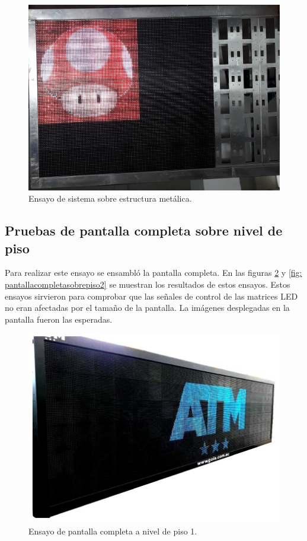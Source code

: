 \begin{figure}[htpb]
	\centering
	\includegraphics[scale=0.1]{Figures/matrizsobreestructura.jpg} 
	\caption{Ensayo de sistema sobre estructura metálica.}
	\label{fig: matrizestructuraparcial}
\end{figure}

\subsection{Pruebas de pantalla completa sobre nivel de piso}
Para realizar este ensayo se ensambló la pantalla completa. En las figuras \ref{fig: pantallacompletasobrepiso1} y \ref{fig: pantallacompletasobrepiso2} se muestran los resultados de estos ensayos. Estos ensayos sirvieron para comprobar que las señales de control de las matrices LED no eran afectadas por el tamaño de la pantalla. La imágenes desplegadas en la pantalla fueron las esperadas.

\begin{figure}[htpb]
	\centering
	\includegraphics[scale=0.6]{Figures/vmsfc8m.jpg} 
	\caption{Ensayo de pantalla completa a nivel de piso 1.}
	\label{fig: pantallacompletasobrepiso1}
\end{figure}



